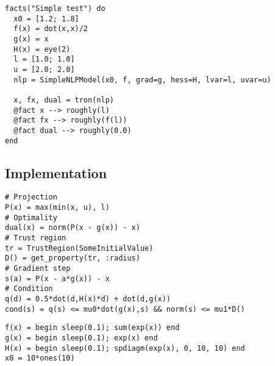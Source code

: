 

\begin{frame}[t,fragile]
  \begin{verbatim}
facts("Simple test") do
  x0 = [1.2; 1.8]
  f(x) = dot(x,x)/2
  g(x) = x
  H(x) = eye(2)
  l = [1.0; 1.0]
  u = [2.0; 2.0]
  nlp = SimpleNLPModel(x0, f, grad=g, hess=H, lvar=l, uvar=u)

  x, fx, dual = tron(nlp)
  @fact x --> roughly(l)
  @fact fx --> roughly(f(l))
  @fact dual --> roughly(0.0)
end
\end{verbatim}
\end{frame}

\subsection{Implementation}

\begin{frame}[t,fragile]
  \begin{verbatim}
# Projection
P(x) = max(min(x, u), l)
# Optimality
dual(x) = norm(P(x - g(x)) - x)
# Trust region
tr = TrustRegion(SomeInitialValue)
D() = get_property(tr, :radius)
# Gradient step
s(a) = P(x - a*g(x)) - x
# Condition
q(d) = 0.5*dot(d,H(x)*d) + dot(d,g(x))
cond(s) = q(s) <= mu0*dot(g(x),s) && norm(s) <= mu1*D()
\end{verbatim}
\end{frame}

\begin{frame}[fragile]
  \begin{verbatim}
f(x) = begin sleep(0.1); sum(exp(x)) end
g(x) = begin sleep(0.1); exp(x) end
H(x) = begin sleep(0.1); spdiagm(exp(x), 0, 10, 10) end
x0 = 10*ones(10)
\end{verbatim}
\end{frame}

